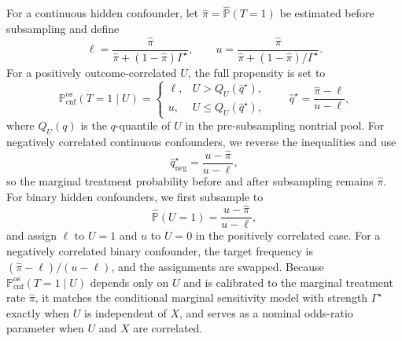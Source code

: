 For a continuous hidden confounder, let \(\widehat{\pi}=\widehat{\mathbb{P}}(T=1)\) be estimated before subsampling and define
\[
  \ell
  =
  \frac{\widehat{\pi}}{\widehat{\pi}+(1-\widehat{\pi})\Gamma^\star},
  \qquad
  u
  =
  \frac{\widehat{\pi}}{\widehat{\pi}+(1-\widehat{\pi})/\Gamma^\star}.
\]
For a positively outcome-correlated \(U\), the full propensity is set to
\[
  \mathbb{P}^{\mathrm{os}}_{\mathrm{cnf}}(T=1\mid U)
  =
  \begin{cases}
    \ell, & U>Q_U(\widehat q^\star),\\
    u, & U\leq Q_U(\widehat q^\star),
  \end{cases}
  \qquad
  \widehat q^\star
  =
  \frac{\widehat{\pi}-\ell}{u-\ell},
\]
where \(Q_U(q)\) is the \(q\)-quantile of \(U\) in the pre-subsampling nontrial pool. For negatively correlated continuous confounders, we reverse the inequalities and use
\[
  \widehat q^\star_{\mathrm{neg}}
  =
  \frac{u-\widehat{\pi}}{u-\ell},
\]
so the marginal treatment probability before and after subsampling remains \(\widehat{\pi}\). For binary hidden confounders, we first subsample to
\[
  \widehat{\mathbb{P}}(U=1)
  =
  \frac{u-\widehat{\pi}}{u-\ell},
\]
and assign \(\ell\) to \(U=1\) and \(u\) to \(U=0\) in the positively correlated case. For a negatively correlated binary confounder, the target frequency is \((\widehat{\pi}-\ell)/(u-\ell)\), and the assignments are swapped. Because \(\mathbb{P}^{\mathrm{os}}_{\mathrm{cnf}}(T=1\mid U)\) depends only on \(U\) and is calibrated to the marginal treatment rate \(\widehat{\pi}\), it matches the conditional marginal sensitivity model with strength \(\Gamma^\star\) exactly when \(U\) is independent of \(X\), and serves as a nominal odds-ratio parameter when \(U\) and \(X\) are correlated.

